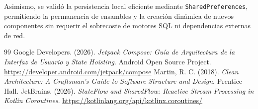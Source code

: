 \documentclass[12pt,a4paper]{article}
\begin{document}
Asimismo, se validó la persistencia local eficiente mediante \texttt{SharedPreferences}, permitiendo la permanencia de ensambles y la creación dinámica de nuevos componentes sin requerir el sobrecoste de motores SQL ni dependencias externas de red.

\begin{thebibliography}{99}
 Google Developers. (2026). \textit{Jetpack Compose: Guía de Arquitectura de la Interfaz de Usuario y State Hoisting}. Android Open Source Project. \url{https://developer.android.com/jetpack/compose}
 Martin, R. C. (2018). \textit{Clean Architecture: A Craftsman's Guide to Software Structure and Design}. Prentice Hall.
 JetBrains. (2026). \textit{StateFlow and SharedFlow: Reactive Stream Processing in Kotlin Coroutines}. \url{https://kotlinlang.org/api/kotlinx.coroutines/}
\end{thebibliography}
\end{document}
